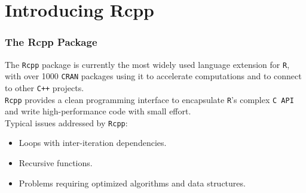\documentclass{beamer}
\def\code#1{\texttt{#1}} %
\begin{document}

\section{Introducing Rcpp}



\begin{frame}
\frametitle{The Rcpp Package}
The \code{Rcpp} package is currently the most widely used language extension for \code{R}, with over 1000 \code{CRAN} packages using it to accelerate computations and to connect to other \code{C++} projects.\pause
\\
\vspace{3mm}
\code{Rcpp} provides a clean programming interface to encapsulate \code{R}'s complex \code{C API} and write high-performance code with small effort. \pause
\\
\vspace{3mm}
Typical issues addressed by \code{Rcpp}:
\begin{itemize}
    \item Loops with inter-iteration dependencies. \pause
    \item Recursive functions. \pause
    \item Problems requiring optimized algorithms and data structures. \pause
\end{itemize}
\end{frame}

\end{document}
